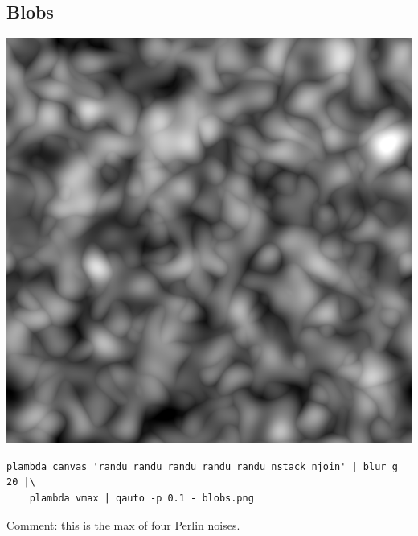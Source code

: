\subsection{Blobs}
\includegraphics{blobs.png}
\begin{verbatim}
plambda canvas 'randu randu randu randu randu nstack njoin' | blur g 20 |\
	plambda vmax | qauto -p 0.1 - blobs.png
\end{verbatim}
Comment: this is the max of four Perlin noises.



